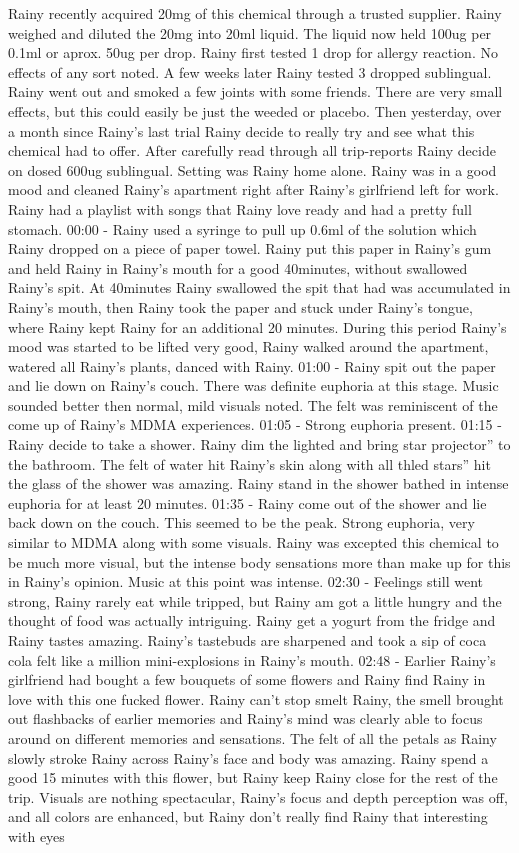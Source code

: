 \documentclass[12pt]{book}
\begin{document}
Rainy recently acquired 20mg of this chemical through a trusted supplier. Rainy weighed and diluted the 20mg into 20ml liquid. The liquid now held 100ug per 0.1ml or aprox. 50ug per drop. Rainy first tested 1 drop for allergy reaction. No effects of any sort noted. A few weeks later Rainy tested 3 dropped sublingual. Rainy went out and smoked a few joints with some friends. There are very small effects, but this could easily be just the weeded or placebo. Then yesterday, over a month since Rainy's last trial Rainy decide to really try and see what this chemical had to offer. After carefully read through all trip-reports Rainy decide on dosed 600ug sublingual. Setting was Rainy home alone. Rainy was in a good mood and cleaned Rainy's apartment right after Rainy's girlfriend left for work. Rainy had a playlist with songs that Rainy love ready and had a pretty full stomach. 00:00 - Rainy used a syringe to pull up 0.6ml of the solution which Rainy dropped on a piece of paper towel. Rainy put this paper in Rainy's gum and held Rainy in Rainy's mouth for a good 40minutes, without swallowed Rainy's spit. At 40minutes Rainy swallowed the spit that had was accumulated in Rainy's mouth, then Rainy took the paper and stuck under Rainy's tongue, where Rainy kept Rainy for an additional 20 minutes. During this period Rainy's mood was started to be lifted very good, Rainy walked around the apartment, watered all Rainy's plants, danced with Rainy. 01:00 - Rainy spit out the paper and lie down on Rainy's couch. There was definite euphoria at this stage. Music sounded better then normal, mild visuals noted. The felt was reminiscent of the come up of Rainy's MDMA experiences. 01:05 - Strong euphoria present. 01:15 - Rainy decide to take a shower. Rainy dim the lighted and bring star projector'' to the bathroom. The felt of water hit Rainy's skin along with all thled stars'' hit the glass of the shower was amazing. Rainy stand in the shower bathed in intense euphoria for at least 20 minutes. 01:35 - Rainy come out of the shower and lie back down on the couch. This seemed to be the peak. Strong euphoria, very similar to MDMA along with some visuals. Rainy was excepted this chemical to be much more visual, but the intense body sensations more than make up for this in Rainy's opinion. Music at this point was intense. 02:30 - Feelings still went strong, Rainy rarely eat while tripped, but Rainy am got a little hungry and the thought of food was actually intriguing. Rainy get a yogurt from the fridge and Rainy tastes amazing. Rainy's tastebuds are sharpened and took a sip of coca cola felt like a million mini-explosions in Rainy's mouth. 02:48 - Earlier Rainy's girlfriend had bought a few bouquets of some flowers and Rainy find Rainy in love with this one fucked flower. Rainy can't stop smelt Rainy, the smell brought out flashbacks of earlier memories and Rainy's mind was clearly able to focus around on different memories and sensations. The felt of all the petals as Rainy slowly stroke Rainy across Rainy's face and body was amazing. Rainy spend a good 15 minutes with this flower, but Rainy keep Rainy close for the rest of the trip. Visuals are nothing spectacular, Rainy's focus and depth perception was off, and all colors are enhanced, but Rainy don't really find Rainy that interesting with eyes 
\end{document}
